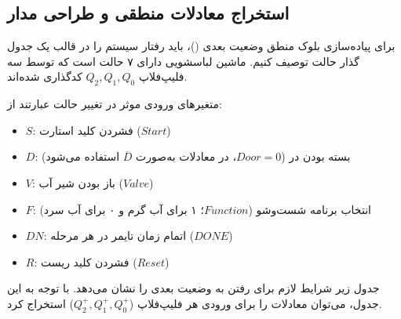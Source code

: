 \documentclass[12pt]{article}
\begin{document}
	\subsection{استخراج معادلات منطقی و طراحی مدار}
	برای پیاده‌سازی بلوک منطق وضعیت بعدی ()، باید رفتار سیستم را در قالب یک جدول گذار حالت توصیف کنیم. ماشین لباسشویی دارای ۷ حالت است که توسط سه فلیپ‌فلاپ $Q_2, Q_1, Q_0$ کدگذاری شده‌اند. 
	
	متغیرهای ورودی موثر در تغییر حالت عبارتند از:
	\begin{itemize}
		\item $S$: فشردن کلید استارت ($Start$)
		\item $D$: بسته بودن در ($Door=0$، در معادلات به‌صورت $\overline{D}$ استفاده می‌شود)
		\item $V$: باز بودن شیر آب ($Valve$)
		\item $F$: انتخاب برنامه شست‌وشو ($Function$؛ ۱ برای آب گرم و ۰ برای آب سرد)
		\item $DN$: اتمام زمان تایمر در هر مرحله ($DONE$)
		\item $R$: فشردن کلید ریست ($Reset$)
	\end{itemize}
	
	جدول زیر شرایط لازم برای رفتن به وضعیت بعدی را نشان می‌دهد. با توجه به این جدول، می‌توان معادلات  را برای ورودی  هر فلیپ‌فلاپ ($Q_2^+, Q_1^+, Q_0^+$) استخراج کرد.
	
	\clearpage
	
\end{document}
